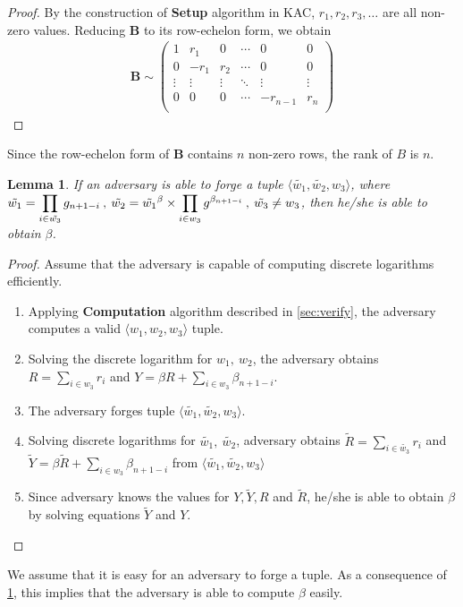 \documentclass[hyp,a4paper,12pt,openbib]{socreport}
\newtheorem{lemma}{Lemma}
\begin{document}

\begin{proof}
\renewcommand{\qedsymbol}{}
By the construction of \textbf{Setup} algorithm in KAC, $r_1, r_2, r_3, \dots$ are all non-zero values. Reducing $\mathbf{B}$ to its row-echelon form, we obtain 
\begin{align*}
\mathbf{B} \sim \begin{pmatrix}		
    1 & r_1 & 0 & \cdots & 0 & 0 \\
  0 & -r_1 & r_2 & \cdots & 0 & 0\\
  \vdots & \vdots & \vdots & \ddots & \vdots & \vdots \\
   0 & 0 & 0 & \cdots & -r_{n-1} & r_n\\
 \end{pmatrix}
\end{align*}
\end{proof}

Since the row-echelon form of $\mathbf{B}$ contains $n$ non-zero rows, the rank of $B$ is $n$.

\begin{lemma} If an adversary is able to forge a tuple $\langle \tilde{w_1}, \tilde{w_2}, w_3 \rangle$, where $ \displaystyle \displaystyle  \tilde{w_1} = \prod_{i \in \tilde{w_3}} g_{n+1-i} \: , \: \tilde{w_2} = \tilde{w_1}^{\beta} \times \prod_{i \in w_3} g^{\beta_{n+1-i}} \: , \:  \tilde{w_3} \neq w_3$, then he/she is able to obtain $\beta$.
\label{thm}
\end{lemma}
\begin{proof} \renewcommand{\qedsymbol}{}
Assume that the adversary is capable of computing discrete logarithms efficiently.
\begin{enumerate}
\item Applying \textbf{Computation} algorithm described in \cref{sec:verify}, the adversary computes a valid $ \langle w_1, w_2, w_3\rangle$ tuple. 
\item \label{itm:w1} Solving the discrete logarithm for $w_1, \: w_2$, the adversary obtains $\displaystyle R= \sum_{i \in w_3} r_i$ and $\displaystyle Y = \beta R +  \sum_{i \in w_3} \beta_{n+1-i}$.
\item The adversary forges tuple $\langle \tilde{w_1}, \tilde{w_2}, w_3 \rangle$.
\item Solving discrete logarithms for $\tilde{w_1}, \: \tilde{w_2}$, adversary obtains $\displaystyle \tilde{R} = \sum_{i \in \tilde{w_3}} r_i$ and $\displaystyle \tilde{Y} = \beta \tilde{R} +  \sum_{i \in w_3} \beta_{n+1-i}$ from $\langle \tilde{w_1}, \tilde{w_2}, w_3 \rangle$ \item Since adversary knows the values for $Y,\tilde{Y}, R$ and $\tilde{R}$, he/she is able to obtain $\beta$ by solving equations $\tilde{Y}$ and $Y$.
\end{enumerate}
\end{proof}
We assume that it is easy for an adversary to forge a tuple. As a consequence of \cref{thm}, this implies that the adversary is able to compute $\beta$ easily. 
\end{document}
